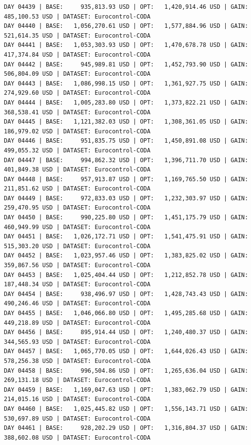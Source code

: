 \documentclass[11pt,a4paper]{article}
\begin{document}
\begin{verbatim}
DAY 04439 | BASE:     935,813.93 USD | OPT:   1,420,914.46 USD | GAIN: 485,100.53 USD | DATASET: Eurocontrol-CODA
DAY 04440 | BASE:   1,056,270.61 USD | OPT:   1,577,884.96 USD | GAIN: 521,614.35 USD | DATASET: Eurocontrol-CODA
DAY 04441 | BASE:   1,053,303.93 USD | OPT:   1,470,678.78 USD | GAIN: 417,374.84 USD | DATASET: Eurocontrol-CODA
DAY 04442 | BASE:     945,989.81 USD | OPT:   1,452,793.90 USD | GAIN: 506,804.09 USD | DATASET: Eurocontrol-CODA
DAY 04443 | BASE:   1,086,998.15 USD | OPT:   1,361,927.75 USD | GAIN: 274,929.60 USD | DATASET: Eurocontrol-CODA
DAY 04444 | BASE:   1,005,283.80 USD | OPT:   1,373,822.21 USD | GAIN: 368,538.41 USD | DATASET: Eurocontrol-CODA
DAY 04445 | BASE:   1,121,382.03 USD | OPT:   1,308,361.05 USD | GAIN: 186,979.02 USD | DATASET: Eurocontrol-CODA
DAY 04446 | BASE:     951,835.75 USD | OPT:   1,450,891.08 USD | GAIN: 499,055.32 USD | DATASET: Eurocontrol-CODA
DAY 04447 | BASE:     994,862.32 USD | OPT:   1,396,711.70 USD | GAIN: 401,849.38 USD | DATASET: Eurocontrol-CODA
DAY 04448 | BASE:     957,913.87 USD | OPT:   1,169,765.50 USD | GAIN: 211,851.62 USD | DATASET: Eurocontrol-CODA
DAY 04449 | BASE:     972,833.03 USD | OPT:   1,232,303.97 USD | GAIN: 259,470.95 USD | DATASET: Eurocontrol-CODA
DAY 04450 | BASE:     990,225.80 USD | OPT:   1,451,175.79 USD | GAIN: 460,949.99 USD | DATASET: Eurocontrol-CODA
DAY 04451 | BASE:   1,026,172.71 USD | OPT:   1,541,475.91 USD | GAIN: 515,303.20 USD | DATASET: Eurocontrol-CODA
DAY 04452 | BASE:   1,023,957.46 USD | OPT:   1,383,825.02 USD | GAIN: 359,867.56 USD | DATASET: Eurocontrol-CODA
DAY 04453 | BASE:   1,025,404.44 USD | OPT:   1,212,852.78 USD | GAIN: 187,448.34 USD | DATASET: Eurocontrol-CODA
DAY 04454 | BASE:     938,496.97 USD | OPT:   1,428,743.43 USD | GAIN: 490,246.46 USD | DATASET: Eurocontrol-CODA
DAY 04455 | BASE:   1,046,066.80 USD | OPT:   1,495,285.68 USD | GAIN: 449,218.89 USD | DATASET: Eurocontrol-CODA
DAY 04456 | BASE:     895,914.44 USD | OPT:   1,240,480.37 USD | GAIN: 344,565.93 USD | DATASET: Eurocontrol-CODA
DAY 04457 | BASE:   1,065,770.05 USD | OPT:   1,644,026.43 USD | GAIN: 578,256.38 USD | DATASET: Eurocontrol-CODA
DAY 04458 | BASE:     996,504.86 USD | OPT:   1,265,636.04 USD | GAIN: 269,131.18 USD | DATASET: Eurocontrol-CODA
DAY 04459 | BASE:   1,169,047.63 USD | OPT:   1,383,062.79 USD | GAIN: 214,015.16 USD | DATASET: Eurocontrol-CODA
DAY 04460 | BASE:   1,025,445.82 USD | OPT:   1,556,143.71 USD | GAIN: 530,697.89 USD | DATASET: Eurocontrol-CODA
DAY 04461 | BASE:     928,202.29 USD | OPT:   1,316,804.37 USD | GAIN: 388,602.08 USD | DATASET: Eurocontrol-CODA

\end{verbatim}
\end{document}
